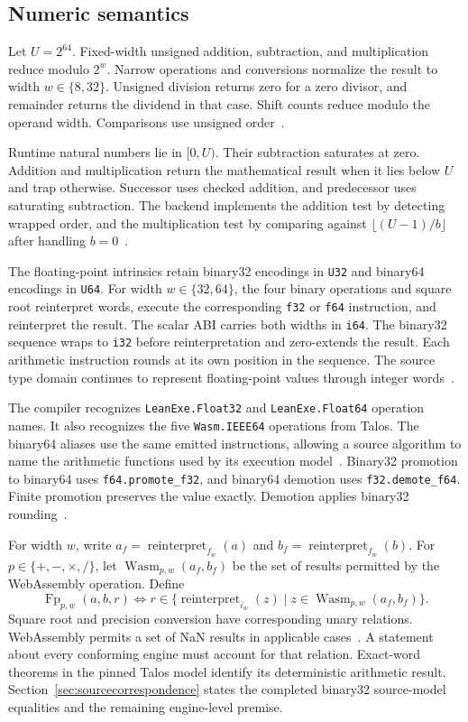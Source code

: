 \documentclass[11pt]{article}
\newcommand{\code}[1]{\texttt{#1}}
\begin{document}
\subsection{Numeric semantics}

Let $U=2^{64}$.  Fixed-width unsigned addition, subtraction, and multiplication reduce modulo $2^w$.  Narrow operations and conversions normalize the result to width $w\in\{8,32\}$.  Unsigned division returns zero for a zero divisor, and remainder returns the dividend in that case.  Shift counts reduce modulo the operand width.  Comparisons use unsigned order~\cite{extract,binary}.

Runtime natural numbers lie in $[0,U)$.  Their subtraction saturates at zero.  Addition and multiplication return the mathematical result when it lies below $U$ and trap otherwise.  Successor uses checked addition, and predecessor uses saturating subtraction.  The backend implements the addition test by detecting wrapped order, and the multiplication test by comparing against $\lfloor(U-1)/b\rfloor$ after handling $b=0$~\cite{binary}.

The floating-point intrinsics retain binary32 encodings in \code{U32} and binary64 encodings in \code{U64}.  For width $w\in\{32,64\}$, the four binary operations and square root reinterpret words, execute the corresponding \code{f32} or \code{f64} instruction, and reinterpret the result.  The scalar ABI carries both widths in \code{i64}.  The binary32 sequence wraps to \code{i32} before reinterpretation and zero-extends the result.  Each arithmetic instruction rounds at its own position in the sequence.  The source type domain continues to represent floating-point values through integer words~\cite{fp32source,binary}.

The compiler recognizes \code{LeanExe.Float32} and \code{LeanExe.Float64} operation names.  It also recognizes the five \code{Wasm.IEEE64} operations from Talos.  The binary64 aliases use the same emitted instructions, allowing a source algorithm to name the arithmetic functions used by its execution model~\cite{types}.  Binary32 promotion to binary64 uses \code{f64.promote\_f32}, and binary64 demotion uses \code{f32.demote\_f64}.  Finite promotion preserves the value exactly.  Demotion applies binary32 rounding~\cite{wasm,binary}.

For width $w$, write $a_f=\operatorname{reinterpret}_{f_w}(a)$ and $b_f=\operatorname{reinterpret}_{f_w}(b)$.  For $p\in\{+,-,\times,/\}$, let $\operatorname{Wasm}_{p,w}(a_f,b_f)$ be the set of results permitted by the WebAssembly operation.  Define
\[
\operatorname{Fp}_{p,w}(a,b,r)
\iff
r\in\{\operatorname{reinterpret}_{i_w}(z)\mid
 z\in\operatorname{Wasm}_{p,w}(a_f,b_f)\}.
\]
Square root and precision conversion have corresponding unary relations.  WebAssembly permits a set of NaN results in applicable cases~\cite{wasm}.  A statement about every conforming engine must account for that relation.  Exact-word theorems in the pinned Talos model identify its deterministic arithmetic result.  Section~\ref{sec:sourcecorrespondence} states the completed binary32 source-model equalities and the remaining engine-level premise.
\end{document}
